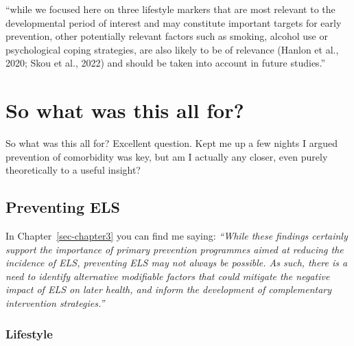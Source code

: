 \documentclass[
  letterpaper,
  DIV=11,
  numbers=noendperiod]{scrreport}
\begin{document}
``while we focused here on three lifestyle markers that are most
relevant to the developmental period of interest and may constitute
important targets for early prevention, other potentially relevant
factors such as smoking, alcohol use or psychological coping strategies,
are also likely to be of relevance (Hanlon et al., 2020; Skou et al.,
2022) and should be taken into account in future studies.''

\section{So what was this all for?}\label{so-what-was-this-all-for}

So what was this all for? Excellent question. Kept me up a few nights I
argued prevention of comorbidity was key, but am I actually any closer,
even purely theoretically to a useful insight?

\subsection{Preventing ELS}\label{preventing-els}

In Chapter~\ref{sec-chapter3} you can find me saying: \emph{``While
these findings certainly support the importance of primary prevention
programmes aimed at reducing the incidence of ELS, preventing ELS may
not always be possible. As such, there is a need to identify alternative
modifiable factors that could mitigate the negative impact of ELS on
later health, and inform the development of complementary intervention
strategies.''}

\subsubsection{Lifestyle}\label{lifestyle}
\end{document}
